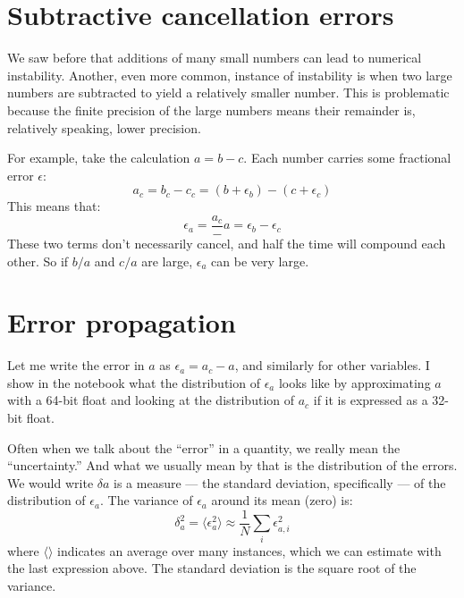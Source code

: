 \section{Subtractive cancellation errors}

We saw before that additions of many small numbers can lead to
numerical instability. Another, even more common, instance of
instability is when two large numbers are subtracted to yield a
relatively smaller number. This is problematic because the finite
precision of the large numbers means their remainder is, relatively
speaking, lower precision.

For example, take the calculation $a = b - c$. 
Each number carries some fractional error $\epsilon$:
\begin{equation}
a_c = b_c - c_c = (b+\epsilon_b) - (c+\epsilon_c)
\end{equation}
This means that:
\begin{equation}
\epsilon_a = \frac{a_c} - a = \epsilon_b - \epsilon_c
\end{equation}
These two terms don't necessarily cancel, and half the time will
compound each other. So if $b/a$ and $c/a$ are large, $\epsilon_a$ can
be very large. 

\section{Error propagation}

Let me write the error in $a$ as $\epsilon_a = a_c - a$, and similarly
for other variables.  I show in the notebook what the distribution of
$\epsilon_a$ looks like by approximating $a$ with a 64-bit float and
looking at the distribution of $a_c$ if it is expressed as a 32-bit
float. 

Often when we talk about the ``error'' in a quantity, we really mean
the ``uncertainty.'' And what we usually mean by that is the
distribution of the errors.  We would write $\delta a$ is a measure
--- the standard deviation, specifically --- of the distribution of
$\epsilon_a$.  The variance of $\epsilon_a$ around its mean (zero) is:
\begin{equation}
\delta_a^2 = \langle \epsilon_a^2 \rangle \approx \frac{1}{N}\sum_i
\epsilon_{a,i}^2
\end{equation}
where $\langle\rangle$ indicates an average over many instances, which we
can estimate with the last expression above. The standard deviation is
the square root of the variance.


